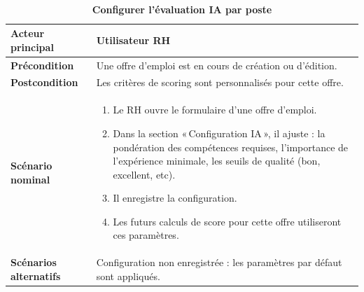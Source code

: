 \documentclass[12pt,a4paper,oneside]{report}
\begin{document}
\begin{itemize}
\begin{table}[H]
\centering
\caption{\textbf{Configurer l’évaluation IA par poste}} \\
\vspace{0.3cm}
\begin{tabular}{|p{3.5cm}|p{11cm}|}
\hline
\textbf{Acteur principal} & Utilisateur RH \\
\hline
\textbf{Précondition} & Une offre d’emploi est en cours de création ou d’édition. \\
\hline
\textbf{Postcondition} & Les critères de scoring sont personnalisés pour cette offre. \\
\hline
\textbf{Scénario nominal} &
\begin{minipage}[t]{10.5cm}
\begin{enumerate}
    \item Le RH ouvre le formulaire d’une offre d’emploi.
    \item Dans la section « Configuration IA », il ajuste : la pondération des compétences requises, l’importance de l’expérience minimale, les seuils de qualité (bon, excellent, etc).
    
    \item Il enregistre la configuration.
    \item Les futurs calculs de score pour cette offre utiliseront ces paramètres.
    \vspace{0.3cm}
\end{enumerate}
\end{minipage} \\
\hline
\textbf{Scénarios alternatifs} &
\begin{minipage}[t]{10.5cm}
Configuration non enregistrée : les paramètres par défaut sont appliqués.
\end{minipage} \\
\hline
\end{tabular}
\end{table}


\end{itemize}
\end{document}
